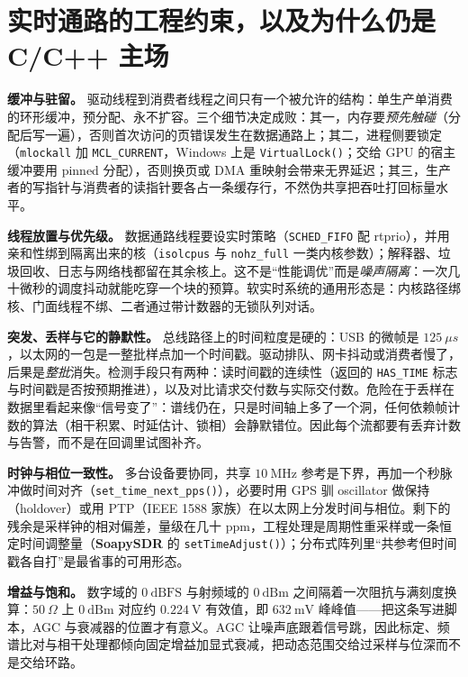 \documentclass[12pt,a4paper,fontset=fandol]{ctexbook}
\newcommand{\Fn}[1]{\texttt{#1()}}
\newcommand{\Tp}[1]{\texttt{#1}}
\newcommand{\Bk}{\allowbreak}
\newcommand{\Lib}[1]{\textbf{#1}}
\begin{document}
\section{实时通路的工程约束，以及为什么仍是 C/C++ 主场}

\textbf{缓冲与驻留。} 驱动线程到消费者线程之间只有一个被允许的结构：单生产单消费的环形缓冲，预分配、永不扩容。三个细节决定成败：其一，内存要\emph{预先触碰}（分配后写一遍），否则首次访问的页错误发生在数据通路上；其二，进程侧要锁定（\Tp{mlockall} \Bk{} 加 \Tp{MCL\_CURRENT}，Windows 上是 \Fn{VirtualLock}；交给 GPU 的宿主缓冲要用 pinned 分配），否则换页或 DMA 重映射会带来无界延迟；其三，生产者的写指针与消费者的读指针要各占一条缓存行，不然伪共享把吞吐打回标量水平。

\textbf{线程放置与优先级。} 数据通路线程要设实时策略（\Tp{SCHED\_FIFO} 配 rtprio），并用亲和性绑到隔离出来的核（\Tp{isolcpus} 与 \Tp{nohz\_full} 一类内核参数）；解释器、垃圾回收、日志与网络栈都留在其余核上。这不是``性能调优''而是\emph{噪声隔离}：一次几十微秒的调度抖动就能吃穿一个块的预算。软实时系统的通用形态是：内核路径绑核、门面线程不绑、二者通过带计数器的无锁队列对话。

\textbf{突发、丢样与它的静默性。} 总线路径上的时间粒度是硬的：USB 的微帧是 $125\ \mu s$，以太网的一包是一整批样点加一个时间戳。驱动排队、网卡抖动或消费者慢了，后果是\emph{整批}消失。检测手段只有两种：读时间戳的连续性（返回的 \Tp{HAS\_TIME} \Bk{} 标志与时间戳是否按预期推进），以及对比请求交付数与实际交付数。危险在于丢样在数据里看起来像``信号变了''：谱线仍在，只是时间轴上多了一个洞，任何依赖帧计数的算法（相干积累、时延估计、锁相）会静默错位。因此每个流都要有丢弃计数与告警，而不是在回调里试图补齐。

\textbf{时钟与相位一致性。} 多台设备要协同，共享 $10\ \text{MHz}$ 参考是下界，再加一个秒脉冲做时间对齐（\Fn{set\_time\_next\_pps}），必要时用 GPS 驯 oscillator 做保持（holdover）或用 PTP（IEEE 1588 家族）在以太网上分发时间与相位。剩下的残余是采样钟的相对偏差，量级在几十 ppm，工程处理是周期性重采样或一条恒定时间调整量（\Lib{SoapySDR} 的 \Fn{setTimeAdjust}）；分布式阵列里``共参考但时间戳各自打''是最省事的可用形态。

\textbf{增益与饱和。} 数字域的 $0\ \text{dBFS}$ 与射频域的 $0\ \text{dBm}$ 之间隔着一次阻抗与满刻度换算：$50\ \Omega$ 上 $0\ \text{dBm}$ 对应约 $0.224\ \text{V}$ 有效值，即 $632\ \text{mV}$ 峰峰值——把这条写进脚本，AGC 与衰减器的位置才有意义。AGC 让噪声底跟着信号跳，因此标定、频谱比对与相干处理都倾向固定增益加显式衰减，把动态范围交给过采样与位深而不是交给环路。
\end{document}
